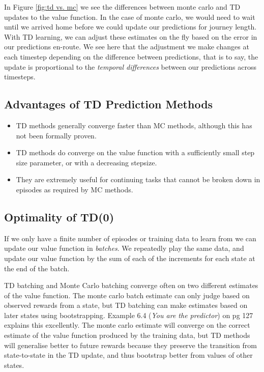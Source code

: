 In Figure \ref{fig:td vs. mc} we see the differences between monte carlo and TD updates to the value function. In the case of monte carlo, we would need to wait until we arrived home before we could update our predictions for journey length. With TD learning, we can adjust these estimates on the fly based on the error in our predictions en-route. We see here that the adjustment we make changes at each timestep depending on the difference between predictions, that is to say, the update is proportional to the \textit{temporal differences} between our predictions across timesteps.

\subsection{Advantages of TD Prediction Methods}
\begin{itemize}
\item TD methods generally converge faster than MC methods, although this has not been formally proven.
\item TD methods do converge on the value function with a sufficiently small step size parameter, or with a decreasing stepsize.
\item They are extremely useful for continuing tasks that cannot be broken down in episodes as required by MC methods.
\end{itemize}

\subsection{Optimality of TD(0)}
If we only have a finite number of episodes or training data to learn from we can update our value function in \textit{batches}. We repeatedly play the same data, and update our value function by the sum of each of the increments for each state at the end of the batch.

TD batching and Monte Carlo batching converge often on two different estimates of the value function. The monte carlo batch estimate can only judge based on observed rewards from a state, but TD batching can make estimates based on later states using bootstrapping. Example 6.4 (\textit{You are the predictor}) on pg 127 explains this excellently. The monte carlo estimate will converge on the correct estimate of the value function produced by the training data, but TD methods will generalise better to future rewards because they preserve the transition from state-to-state in the TD update, and thus bootstrap better from values of other states.

